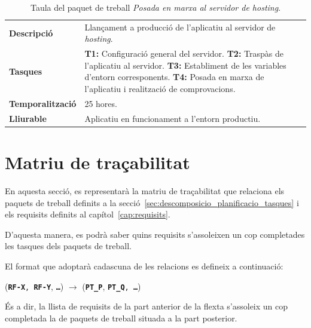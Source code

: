 \documentclass[a4paper,12pt]{ThesisStyle}
\begin{document}
\begin{table}[H]
  \begin{tabularx}{\textwidth}{l | X}
    \toprule
    \rowcolor{Purple}
    \multicolumn{2}{c}{\texttt{\textbf{PT\_5.2:}} Posada en marxa al servidor de \textit{hosting}}\\
    \midrule[0.9pt]
    \textbf{Descripció}       & Llançament a producció de l'aplicatiu al servidor de \textit{hosting}.\\
    \midrule
    \textbf{Tasques}          & \textbf{T1:} Configuració general del servidor.
    \newline \textbf{T2:} Traspàs de l'aplicatiu al servidor.
    \newline \textbf{T3:} Establiment de les variables d'entorn corresponents.
    \newline \textbf{T4:} Posada en marxa de l'aplicatiu i realització de comprovacions.\\
    \midrule
    \textbf{Temporalització}  & 25 hores.\\
    \midrule
    \textbf{Lliurable}        & Aplicatiu en funcionament a l'entorn productiu.\\
    \bottomrule
  \end{tabularx}
  \caption{\label{taula:pt_5.2} Taula del paquet de treball \emph{Posada en marxa al servidor de \textit{hosting}}.}
\end{table}


\section{Matriu de traçabilitat}
\label{sec:matriu_tracabilitat}

En aquesta secció, es representarà la matriu de traçabilitat que relaciona els paquets de treball definits a la secció~\ref{sec:descomposicio_planificacio_tasques} i els requisits definits al capítol~\ref{cap:requisits}.

D'aquesta manera, es podrà saber quins requisits s'assoleixen un cop completades les tasques dels paquets de treball.

El format que adoptarà cadascuna de les relacions es defineix a continuació:
\\[8pt]
\centerline{(\texttt{\textbf{RF-X}, \texttt{\textbf{RF-Y}}}, \texttt{\textbf{\ldots}}) $\longrightarrow$ (\texttt{\textbf{PT\_P}}, \texttt{\textbf{PT\_Q}, \texttt{\textbf{\ldots}}})}

És a dir, la llista de requisits de la part anterior de la flexta s'assoleix un cop completada la de paquets de treball situada a la part posterior.
\end{document}
